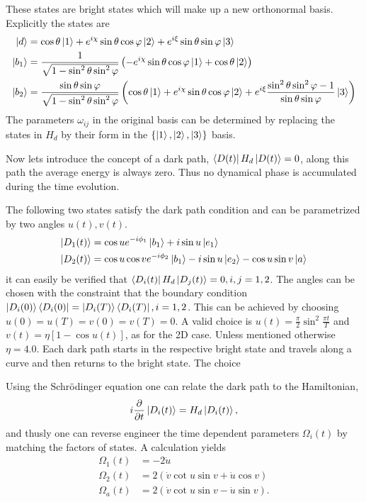 These states are bright states which will make up a new orthonormal basis. 
Explicitly the states are 
\begin{equation}
\label{eq:states}
\begin{aligned}
\ket{d} &= \cos\theta\ket{1} + e^{i\chi}\sin\theta\cos\varphi\ket{2} + e^{i\xi}\sin\theta\sin\varphi\ket{3}
\\
\ket{b_1} &= \frac{1}{\sqrt{1-\sin^2\theta\sin^2\varphi}} \left(-e^{i\chi}\sin\theta\cos\varphi\ket{1} + \cos\theta\ket{2} \right)
\\
\ket{b_2} &= \frac{\sin\theta\sin\varphi}{\sqrt{1-\sin^2\theta\sin^2\varphi}} \left(\cos\theta\ket{1} + e^{i\chi}\sin\theta\cos\varphi\ket{2} + e^{i\xi}\frac{\sin^2\theta\sin^2\varphi - 1}{\sin\theta\sin\varphi} \ket{3}\right)
\end{aligned}
\end{equation}
The parameters $\omega_{ij}$ in the original basis can be determined by replacing the states in $H_d$ by their form in the $\{\ket{1},\ket{2},\ket{3}\}$ basis.

Now lets introduce the concept of a dark path, $\bra{D(t)}H_d\ket{D(t)} = 0$, along this path the average energy is always zero. Thus no dynamical phase is accumulated during the time evolution.

The following two states satisfy the dark path condition and can be parametrized by two angles $u(t), v(t)$.
\begin{equation}
\label{eq:dpaths}
\begin{aligned}
\ket{D_1(t)} &= \cos u e^{-i\phi_1}\ket{b_1} + i\sin u \ket{e_1}
\\
\ket{D_2(t)} &= \cos u\cos v e^{-i\phi_2}\ket{b_1} - i\sin u \ket{e_2} - \cos u\sin v \ket{a}
\end{aligned}
\end{equation}
it can easily be verified that $\bra{D_i(t)}H_d\ket{D_j(t)} = 0, i,j = 1,2$. The angles can be chosen with the constraint that the boundary condition $\ket{D_i(0)}\bra{D_i(0)} = \ket{D_i(T)}\bra{D_i(T)}, i = 1,2$. This can be achieved by choosing $u(0) = u(T) = v(0) = v(T) = 0$. A valid choice is $u(t) = \frac{\pi}{2}\sin^2\frac{\pi t}{T}$ and $v(t) = \eta\left[1 - \cos u(t)\right]$, as for the 2D case. Unless mentioned otherwise $\eta = 4.0$. Each dark path starts in the respective bright state and travels along a curve and then returns to the bright state. The choice 

Using the Schrödinger equation one can relate the dark path to the Hamiltonian,
\begin{equation}
i\pdv{}{t}\ket{D_i(t)} = H_d\ket{D_i(t)},
\end{equation}
and thusly one can reverse engineer the time dependent parameters $\Omega_i(t)$ by matching the factors of states. A calculation yields 
\begin{equation}
\begin{aligned}
\Omega_1(t) &= -2\dot{u}
\\ 
\Omega_2(t) &= 2\left(\dot{v}\cot u\sin v + \dot{u}\cos v \right)
\\
\Omega_a(t) &= 2\left(\dot{v}\cot u\sin v - \dot{u}\sin v \right).
\end{aligned}
\end{equation}

